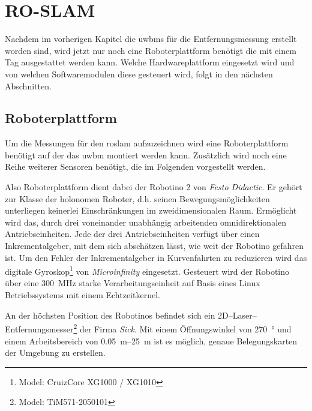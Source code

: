 \begin{comment}
------------------------------------------------------------------------------------------
\end{comment}
\chapter{RO-SLAM}\label{ch:ro_slam}

Nachdem im vorherigen Kapitel die \Glspl{uwbm} für die Entfernungsmessung erstellt worden sind, wird jetzt nur noch eine Roboterplattform benötigt die mit einem Tag ausgestattet werden kann. Welche Hardwareplattform eingesetzt wird und von welchen Softwaremodulen diese gesteuert wird, folgt in den nächsten Abschnitten.

\begin{comment}
--------------------------------------------------------------------------------
- Einsatz mobiler Roboter in der Logistik am Beispiel des Robotino
	- http://www.r-moehrle.de/wissenschaftlicheArbeiten/robotino1.pdf
\end{comment}
\section{Roboterplattform}

Um die Messungen für den \Gls{roslam} aufzuzeichnen wird eine Roboterplattform benötigt auf der das \Gls{uwbm} montiert werden kann. Zusätzlich wird noch eine Reihe weiterer Sensoren benötigt, die im Folgenden vorgestellt werden.

Also Roboterplattform dient dabei der Robotino 2 von \textit{Festo Didactic}. Er gehört zur Klasse der holonomen Roboter, d.h. seinen Bewegungsmöglichkeiten unterliegen keinerlei Einschränkungen im zweidimensionalen Raum. Ermöglicht wird das, durch drei voneinander unabhängig arbeitenden omnidirektionalen Antriebseinheiten. Jede der drei Antriebseinheiten verfügt über einen Inkrementalgeber, mit dem sich abschätzen lässt, wie weit der Robotino gefahren ist. Um den Fehler der Inkrementalgeber in Kurvenfahrten zu reduzieren wird das digitale Gyroskop\footnote{Model: CruizCore XG1000 / XG1010} von \textit{Microinfinity} eingesetzt. Gesteuert wird der Robotino über eine \SI{300}{\MHz} starke Verarbeitungseinheit auf Basis eines Linux Betriebssystems mit einem Echtzeitkernel. \cite{festo2007robotinomanual}

An der höchsten Position des Robotinos befindet sich ein 2D--Laser--Entfernungsmesser\footnote{Model: TiM571-2050101} der Firma \textit{Sick}. Mit einem Öffnungswinkel von \SI{270}{\degree} und einem Arbeitsbereich von \SIrange{0.05}{25}{\meter} ist es möglich, genaue Belegungskarten der Umgebung zu erstellen. \cite{sick2016operatingmanual}

